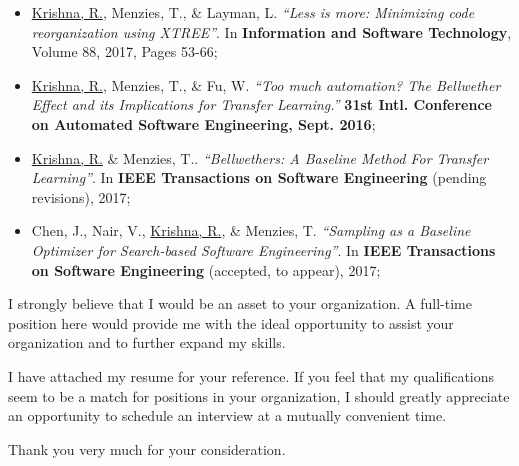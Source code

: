 \documentclass[11pt,letterpaper,sans]{moderncv}         \moderncvstyle{casual}
\begin{document}
\begin{itemize}

\item\small \underline{Krishna, R.}, Menzies, T., \& Layman, L. 
    \textit{``Less is more: Minimizing code reorganization using XTREE''}. In 
    \textbf{Information and Software Technology}, Volume 88, 2017, Pages 53-66;\\[0.1cm]
    
    \item\small  \underline{Krishna, R.}, Menzies, T., \& Fu, W. \textit{``Too 
    much automation? The Bellwether Effect and its Implications for Transfer 
    Learning.''} \textbf{31st Intl. Conference on Automated Software 
    Engineering, Sept. 2016};\\[0.1cm]
    
    \item\small \underline{Krishna, R.} \& Menzies, T.. \textit{``Bellwethers: 
    A Baseline Method For Transfer Learning''}. In\textbf{ IEEE Transactions on 
    Software Engineering} (pending revisions), 2017;\\[0.1cm]
    
    \item\small Chen, J., Nair, V., \underline{Krishna, R.}, \& Menzies, T. 
    \textit{``Sampling as a Baseline Optimizer for Search-based Software
    Engineering''}. In \textbf{IEEE Transactions on Software Engineering} 
    (accepted, to appear), 2017;\\[0.1cm]
\end{itemize}

I strongly believe that I would be an asset to your organization. A full-time 
position here would provide me with the ideal opportunity to assist your 
organization and to further expand my skills.

I have attached my resume for your reference. If you feel that my 
qualifications seem to be a match for positions in your organization, I should 
greatly appreciate an opportunity to schedule an interview at a mutually 
convenient time.

Thank you very much for your consideration.


\makeletterclosing
\end{document}
